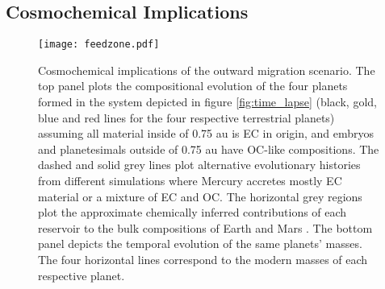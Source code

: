 \documentclass[trackchanges,twocolumn]{aastex}
\begin{document}
\subsection{Cosmochemical Implications}

\begin{figure}
\centering
	\texttt{[image: feedzone.pdf]}
	\caption{Cosmochemical implications of the outward migration scenario.  The top panel plots the compositional evolution of the four planets formed in the system depicted in figure \ref{fig:time_lapse} (black, gold, blue and red lines for the four respective terrestrial planets) assuming all material inside of 0.75 au is EC in origin, and embryos and planetesimals outside of 0.75 au have OC-like compositions.  The dashed and solid grey lines plot alternative evolutionary histories from different simulations where Mercury accretes mostly EC material or a mixture of EC and OC.  The horizontal grey regions plot the approximate chemically inferred contributions of each reservoir to the bulk compositions of Earth \citep[$\sim$70$\%$ EC and 30$\%$ OC, e.g.:][]{dauphas17} and Mars \citep[$\sim$50$\%$ EC and 50$\%$ OC, e.g.:][]{tang14}.   The bottom panel depicts the temporal evolution of the same planets' masses.  The four horizontal lines correspond to the modern masses of each respective planet.}
	\label{fig:feedzone}
\end{figure}
\end{document}
